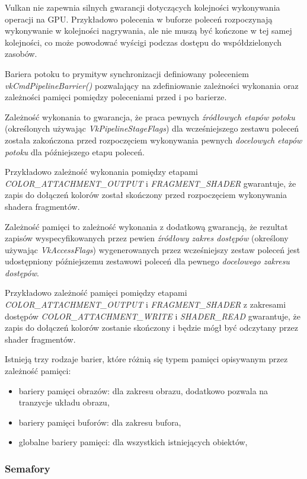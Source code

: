Vulkan nie zapewnia silnych gwarancji dotyczących kolejności wykonywania operacji na GPU.
Przykładowo polecenia w buforze poleceń rozpoczynają wykonywanie w kolejności nagrywania, ale nie muszą być kończone w tej samej kolejności, co może powodować wyścigi podczas dostępu do współdzielonych zasobów.

Bariera potoku to prymityw synchronizacji definiowany poleceniem \textit{vkCmdPipelineBarrier()} pozwalający na zdefiniowanie zależności wykonania oraz zależności pamięci pomiędzy poleceniami przed i po barierze.

Zależność wykonania to gwarancja, że praca pewnych \textit{źródłowych etapów potoku} (określonych używając
\textit{VkPipelineStageFlags}) dla wcześniejszego zestawu poleceń została zakończona przed rozpoczęciem wykonywania pewnych
\textit{docelowych etapów potoku} dla późniejszego etapu poleceń. 

Przykładowo zależność wykonania pomiędzy etapami
\textit{COLOR\_ATTACHMENT\_OUTPUT} i \textit{FRAGMENT\_SHADER} gwarantuje, że zapis do dołączeń kolorów został skończony przed rozpoczęciem
wykonywania shadera fragmentów.

Zależność pamięci to zależność wykonania z dodatkową gwarancją, że rezultat zapisów wyspecyfikowanych przez pewien \textit{źródłowy
	zakres dostępów} (określony używając \textit{VkAccessFlags}) wygenerowanych przez wcześniejszy zestaw poleceń jest udostępniony
późniejszemu zestawowi poleceń dla pewnego \textit{docelowego zakresu dostępów}.

Przykładowo zależność pamięci pomiędzy etapami
\textit{COLOR\_ATTACHMENT\_OUTPUT} i \textit{FRAGMENT\_SHADER} z zakresami dostępów \textit{COLOR\_ATTACHMENT\_WRITE} i \textit{SHADER\_READ} gwarantuje, że zapis
do dołączeń kolorów zostanie skończony i będzie mógł być odczytany przez shader fragmentów.

Istnieją trzy rodzaje barier, które różnią się typem pamięci opisywanym przez zależność pamięci:
\begin{itemize}
	\item {bariery pamięci obrazów}: dla zakresu obrazu, dodatkowo pozwala na tranzycje układu obrazu,
	\item {bariery pamięci buforów}: dla zakresu bufora,
	\item {globalne bariery pamięci}: dla wszystkich istniejących obiektów,
\end{itemize}

\subsubsection{Semafory}

